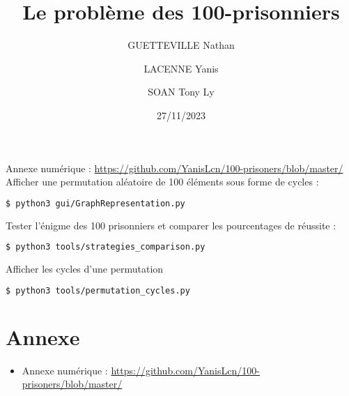 \documentclass[a4paper]{article}
\title{Le problème des 100-prisonniers}
\date{27/11/2023}
\author{GUETTEVILLE Nathan}
\author{LACENNE Yanis}
\author{SOAN Tony Ly}
\affil{G4S12}
\begin{document}
\maketitle

\noindent Annexe numérique : \url{https://github.com/YanisLcn/100-prisoners/blob/master/} \\

\noindent Afficher une permutation aléatoire de 100 éléments sous forme de cycles :
\begin{lstlisting}[language=bash]
$ python3 gui/GraphRepresentation.py
\end{lstlisting} 

\noindent Tester l'énigme des 100 prisonniers et comparer les pourcentages de réussite :
\begin{lstlisting}[language=bash]
$ python3 tools/strategies_comparison.py
\end{lstlisting}

\noindent Afficher les cycles d'une permutation
\begin{lstlisting}[language=bash]
$ python3 tools/permutation_cycles.py
\end{lstlisting} 


\tableofcontents

\newpage











\section{Annexe}
\begin{itemize}
	\item Annexe numérique : \url{https://github.com/YanisLcn/100-prisoners/blob/master/}

\end{itemize}


\end{document}
